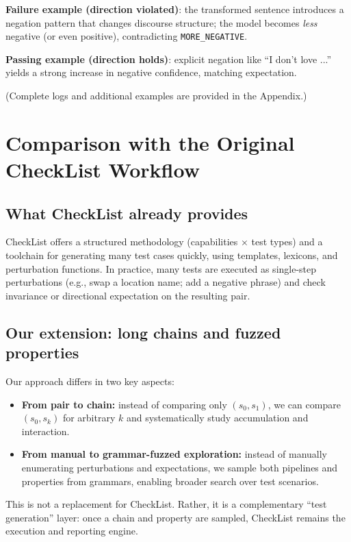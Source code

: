 \documentclass[11pt]{article}
\begin{document}
\textbf{Failure example (direction violated)}: the transformed sentence introduces a negation pattern that changes discourse structure; the model becomes \emph{less} negative (or even positive), contradicting \texttt{MORE\_NEGATIVE}.

\textbf{Passing example (direction holds)}: explicit negation like ``I don't love ...'' yields a strong increase in negative confidence, matching expectation.

(Complete logs and additional examples are provided in the Appendix.)

\section{Comparison with the Original CheckList Workflow}

\subsection{What CheckList already provides}
CheckList offers a structured methodology (capabilities × test types) and a toolchain for generating many test cases quickly, using templates, lexicons, and perturbation functions. In practice, many tests are executed as single-step perturbations (e.g., swap a location name; add a negative phrase) and check invariance or directional expectation on the resulting pair.

\subsection{Our extension: long chains and fuzzed properties}
Our approach differs in two key aspects:
\begin{itemize}
  \item \textbf{From pair to chain:} instead of comparing only $(s_0, s_1)$, we can compare $(s_0, s_k)$ for arbitrary $k$ and systematically study accumulation and interaction.
  \item \textbf{From manual to grammar-fuzzed exploration:} instead of manually enumerating perturbations and expectations, we sample both pipelines and properties from grammars, enabling broader search over test scenarios.
\end{itemize}

This is not a replacement for CheckList. Rather, it is a complementary ``test generation'' layer: once a chain and property are sampled, CheckList remains the execution and reporting engine.
\end{document}
